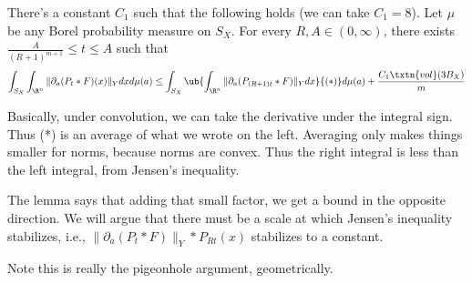 \begin{lem}
There's a constant $C_1$ such that the following holds (we can take $C_1=8$). 
Let $\mu$ be any Borel probability measure on $S_X$. For every $R, A \in (0, \infty)$, there exists $ \frac{A}{(R + 1)^{m + 1}} \leq t \leq A$ such that 
\[
\int_{S_X} \int_{\R^n} \|\partial_a (P_t * F)(x)\|_Y dx d\mu(a) \leq \int_{S_X} \ub{\int_{\R^n} \|\partial_a(P_{(R + 1)t} * F)\|_Y dx}{(*)} d\mu(a) + \frac{C_1\txtn{vol}(3B_X)}{m}
\]
\end{lem}
Basically, under convolution, we can take the derivative under the integral sign. 
Thus (*) is an average of what we wrote on the left. Averaging only makes things smaller for norms, because norms are convex. Thus the  right integral is less than the left integral, from Jensen's inequality. 

The lemma says that  adding that small factor, we get a bound in the opposite direction. %
We will argue that there must be a scale at which Jensen's inequality stabilizes, i.e., $\|\partial_a(P_t*F)\|_Y*P_{Rt}(x)$ stabilizes to a constant.

Note this is really the pigeonhole argument, geometrically.

